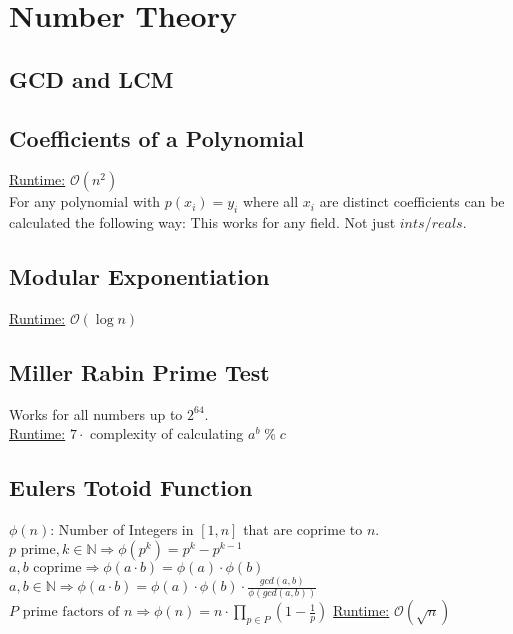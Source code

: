 \section{Number Theory}
\subsection{GCD and LCM}

\subsection{Coefficients of a Polynomial}
\underline{Runtime:} $\mathcal{O}(n^2)$ \\
For any polynomial with $p(x_i) = y_i$ where all $x_i$ are distinct
coefficients can be calculated the following way:
This works for any field. Not just $ints$/$reals$.
\subsection{Modular Exponentiation}
\underline{Runtime:} $\mathcal{O}(\log n)$

\subsection{Miller Rabin Prime Test}
Works for all numbers up to $2^{64}$.\\
\underline{Runtime:} $7\cdot$ complexity of calculating $a^b \; \% \; c$

\subsection{Eulers Totoid Function}
$\phi(n)$: Number of Integers in $[1, n]$ that are coprime to $n$.\\
$p \text{ prime}, k \in \mathbb{N} \Rightarrow \phi(p^k) = p^k - p^{k-1}$ \\
$a, b \text{ coprime} \Rightarrow \phi(a \cdot b) = \phi(a) \cdot \phi(b)$ \\
$a, b \in \mathbb{N} \Rightarrow \phi(a \cdot b) = \phi(a) \cdot \phi(b) \cdot \frac{gcd(a, b)}{\phi(gcd(a,b))}$ \\
$P \text{ prime factors of } n \Rightarrow \phi(n) = n \cdot \prod_{p \in P} (1 - \frac{1}{p})$
\underline{Runtime:} $\mathcal{O}(\sqrt{n})$


